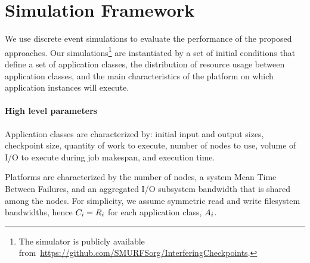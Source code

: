 
\section{Simulation Framework}
\label{sec:simulator}

We use discrete event simulations to evaluate the performance of the proposed
approaches.  Our simulations\footnote{The simulator is publicly available
from~\url{https://github.com/SMURFSorg/InterferingCheckpoints}.} are instantiated
by a set of initial conditions that define a set of application classes, the
distribution of resource usage between application classes, and the main
characteristics of the platform on which application instances will execute.

\paragraph*{High level parameters}
Application classes are characterized by: initial input and output sizes, checkpoint
size, quantity of work to execute, number of nodes to use, volume of I/O to
execute during job makespan, and execution time.

%

Platforms are characterized by the number of nodes, a system Mean Time
Between Failures, and an aggregated I/O subsystem bandwidth that is shared among the
nodes. For simplicity, we assume symmetric read and write filesystem bandwidths, hence
$C_{i}=R_{i}$ for each application class, $A_{i}$.

